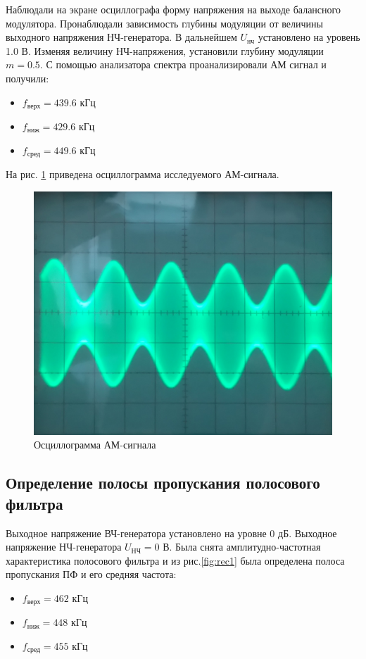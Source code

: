 Наблюдали на экране осциллографа форму напряжения на выходе балансного модулятора. Пронаблюдали зависимость глубины модуляции от величины выходного напряжения НЧ-генератора.
В дальнейшем $U_{\text{нч}}$ установлено на уровень 1.0 В. Изменяя величину НЧ-напряжения, установили глубину модуляции $m=0.5$. С помощью анализатора спектра проанализировали АМ сигнал и получили:

\begin{itemize}
	\item $f_{\text{верх}}=439.6$ кГц
	\item $f_{\text{ниж}}=429.6$ кГц
	\item $f_{\text{сред}}=449.6$ кГц
\end{itemize}
На рис. \ref{fig:rec2} приведена осциллограмма исследуемого АМ-сигнала.

\begin{figure}[H]
	\centering
	\includegraphics[width=0.7\linewidth]{img/img1}
	\caption{Осциллограмма АМ-сигнала}
	\label{fig:rec2}
\end{figure}


\subsection{Определение полосы пропускания полосового фильтра}
Выходное напряжение ВЧ-генератора установлено на уровне 0 дБ. Выходное напряжение НЧ-генератора $U_{\text{НЧ}}=0$ В.
Была снята амплитудно-частотная характеристика полосового фильтра и из рис.\ref{fig:rec1} была определена полоса пропускания ПФ и его средняя частота:

\begin{itemize}
	\item $f_{\text{верх}}=462$ кГц
	\item $f_{\text{ниж}}=448$ кГц
	\item $f_{\text{сред}}=455$ кГц
\end{itemize}


